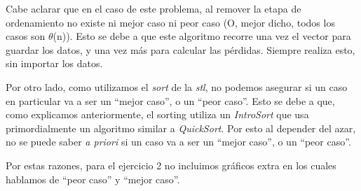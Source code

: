 Cabe aclarar que en el caso de este problema, al remover la etapa de ordenamiento no existe ni mejor caso ni peor caso (O, mejor dicho, todos los casos son $\theta$(n)). Esto se debe a que este algoritmo recorre una vez el vector para guardar los datos, y una vez más para calcular las pérdidas. Siempre realiza esto, sin importar los datos.

Por otro lado, como utilizamos el \emph{sort} de la \emph{stl}, no podemos asegurar si un caso en particular va a ser un ``mejor caso'', o un ``peor caso''. Esto se debe a que, como explicamos anteriormente, el sorting utiliza un \emph{IntroSort} que usa primordialmente un algoritmo similar a \emph{QuickSort}. Por esto al depender del azar, no se puede saber \emph{a priori} si un caso va a ser un ``mejor caso'', o un ``peor caso''.

Por estas razones, para el ejercicio 2 no incluimos gráficos extra en los cuales hablamos de ``peor caso'' y ``mejor caso''.